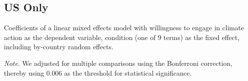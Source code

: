    \subsection{US Only}

\begin{table}[H] 
\caption{Coefficients of a linear mixed effects model with willingness to engage in climate action as the dependent variable, condition (one of 9 terms) as the fixed effect, including by-country random effects.}
 
\end{table}
\textit{Note.} We adjusted for multiple comparisons using the Bonferroni correction, thereby using 0.006 as the threshold for statistical significance.

